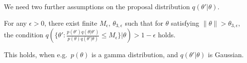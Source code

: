 

We need two further assumptions on the proposal distribution $q(\theta'|\theta)$.
\begin{assumption}
For any $\epsilon>0$,  there exist finite $M_\epsilon$, $\theta_{3,\epsilon}$
such that for $\theta$ satisfying $\| \theta \|  > \theta_{3,\epsilon}$,
the condition $q(\{\theta': \frac{p(\theta')q(\theta|\theta')}{p(\theta)q(\theta'|\theta)} \le M_\epsilon\}|\theta) 
> 1 - \epsilon$ holds.
  \label{asmp:prior}
\end{assumption}
\noindent This holds, when e.g.\ $p(\theta)$ is a gamma distribution,
and $q(\theta'|\theta)$ is Gaussian.


